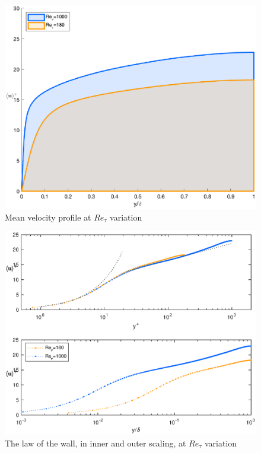 \begin{figure}
\begin{center}
\includegraphics[scale=0.55]{grafici/u_mean_comparison.eps}
\caption{Mean velocity profile at $Re_{\tau}$ variation}
\label{mean:comparison}
\end{center}
\end{figure}
\begin{figure}
\begin{center}
\includegraphics[scale=0.55]{grafici/loglaw_comparison.eps}
\caption{The law of the wall, in inner and outer scaling, at $Re_{\tau}$ variation}
\label{loglaw:comparison}
\end{center}
\end{figure}

